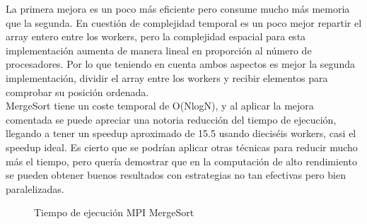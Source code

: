 La primera mejora es un poco más eficiente pero consume mucho más memoria que la segunda. En cuestión de complejidad temporal es un poco mejor repartir el array entero entre los workers, pero la complejidad espacial para esta implementación aumenta de manera lineal en proporción al número de procesadores. Por lo que teniendo en cuenta ambos aspectos es mejor la segunda implementación, dividir el array entre los workers y recibir elementos para comprobar su posición ordenada.\\


MergeSort tiene un coste temporal de O(NlogN), y al aplicar la mejora comentada se puede apreciar una notoria reducción del tiempo de ejecución, llegando a tener un speedup aproximado de 15.5 usando dieciséis workers, casi el speedup ideal. Es cierto que se podrían aplicar otras técnicas para reducir mucho más el tiempo, pero quería demostrar que en la computación de alto rendimiento se pueden obtener buenos resultados con estrategias no tan efectivas pero bien paralelizadas.


\begin{figure}[h!]
\caption{Tiempo de ejecución MPI MergeSort}
\end{figure}


